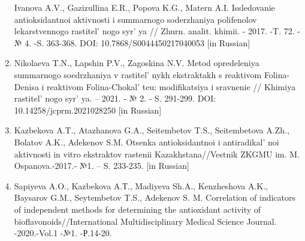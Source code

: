 \begin{references}
\begin{enumerate}
  Ivanova A.V., Gazizullina E.R., Popova K.G., Matern A.I. Issledovanie
  antioksidantnoi aktivnosti i summarnogo soderzhaniya polifenolov
  lekarstvennogo rastitel' nogo syr' ya //
  Zhurn. analit. khimii. - 2017. -T. 72. -№ 4. -S. 363-368. DOI:
  10.7868/S0044450217040053 {[}in Russian{]}
\item
  Nikolaeva T.N., Lapshin P.V., Zagoskina N.V. Metod opredeleniya
  summarnogo soedrzhaniya v rastitel' nykh ekstraktakh s
  reaktivom Folina-Denisa i reaktivom Folina-Chokal' teu:
  modifikatsiya i sravnenie // Khimiya rastitel' nogo
  syr' ya. -- 2021. - № 2. - S. 291-299. DOI:
  10.14258/jcprm.2021028250 {[}in Russian{]}
\item
  Kazbekova A.T., Atazhanova G.A., Seitembetov T.S., Seitembetova A.Zh.,
  Bolatov A.K., Adekenov S.M. Otsenka antioksidantnoi i
  antiradikal' noi aktivnosti in vitro ekstraktov
  rastenii Kazakhstana//Vestnik ZKGMU im. M. Ospanova.-2017.- №1. -- S.
  233-235. {[}in Russian{]}
\item
  Sapiyeva A.O., Kazbekova A.Т., Madiyeva Sh.A., Kenzheshova A.K.,
  Baysarov G.M., Seytembetov T.S., Adekenov S. M. Correlation of
  indicators of independent methods for determining the antioxidant
  activity of bioflavonoids//International Multidisciplinary Medical
  Science Journal. -2020.-Vol.1 -№1. -Р.14-20.
\end{enumerate}
\end{references}

